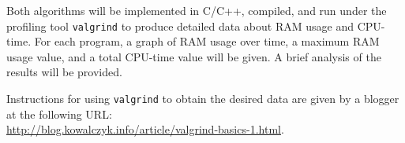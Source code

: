 \documentclass{article}
\begin{document}
Both algorithms will be implemented in C/C++, compiled, and run under the profiling tool \verb|valgrind| to produce detailed data about RAM usage and CPU-time. For each program, a graph of RAM usage over time, a maximum RAM usage value, and a total CPU-time value will be given. A brief analysis of the results will be provided.

Instructions for using \verb|valgrind| to obtain the desired data are given by a blogger at the following URL: \\
\noindent \underline{http://blog.kowalczyk.info/article/valgrind-basics-1.html}.
\end{document}
